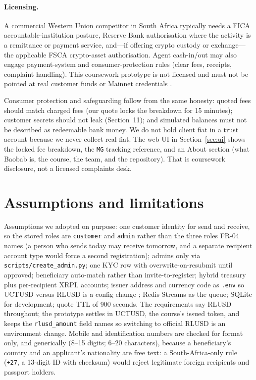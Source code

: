 \documentclass[11pt]{article}
\begin{document}
\paragraph{Licensing.}
A commercial Western Union competitor in South Africa typically needs a FICA accountable-institution posture, Reserve Bank authorisation where the activity is a remittance or payment service, and---if offering crypto custody or exchange---the applicable FSCA crypto-asset authorisation. Agent cash-in/out may also engage payment-system and consumer-protection rules (clear fees, receipts, complaint handling). This coursework prototype is not licensed and must not be pointed at real customer funds or Mainnet credentials \citep{UCTBrief2026}.

Consumer protection and safeguarding follow from the same honesty: quoted fees should match charged fees (our quote locks the breakdown for 15 minutes); customer secrets should not leak (Section~11); and simulated balances must not be described as redeemable bank money. We do not hold client fiat in a trust account because we never collect real fiat. The web UI in Section~\ref{sec:ui} shows the locked fee breakdown, the \texttt{MG} tracking reference, and an About section (what Baobab is, the course, the team, and the repository). That is coursework disclosure, not a licensed complaints desk.

\section{Assumptions and limitations}
\label{sec:assumptions}
Assumptions we adopted on purpose: one customer identity for send and receive, so the stored roles are \texttt{customer} and \texttt{admin} rather than the three roles FR-04 names (a person who sends today may receive tomorrow, and a separate recipient account type would force a second registration); admins only via \texttt{scripts/create\_admin.py}; one KYC row with overwrite-on-resubmit until approved; beneficiary auto-match rather than invite-to-register; hybrid treasury plus per-recipient XRPL accounts; issuer address and currency code as \texttt{.env} so UCTUSD versus RLUSD is a config change \citep{UCTResources2026}; Redis Streams as the queue; SQLite for development; quote TTL of 900 seconds. The requirements say RLUSD throughout; the prototype settles in UCTUSD, the course's issued token, and keeps the \texttt{rlusd\_amount} field names so switching to official RLUSD is an environment change. Mobile and identification numbers are checked for format only, and generically (8--15 digits; 6--20 characters), because a beneficiary's country and an applicant's nationality are free text: a South-Africa-only rule (\texttt{+27}, a 13-digit ID with checksum) would reject legitimate foreign recipients and passport holders.
\end{document}
